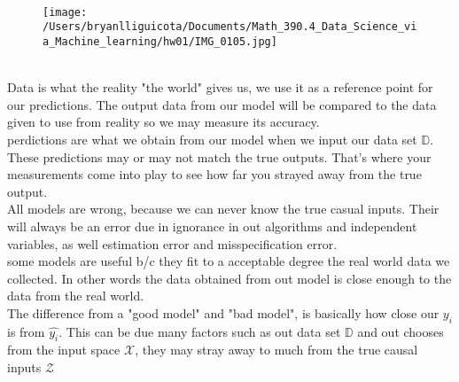 \documentclass[12pt]{article}
\begin{document}
\begin{enumerate}

\\
\begin{figure}[h!]
  \texttt{[image: /Users/bryanlliguicota/Documents/Math\_390.4\_Data\_Science\_via\_Machine\_learning/hw01/IMG\_0105.jpg]}
  \label{fig:boat1}
\end{figure}


\\Data is what the reality "the world" gives us, we use it as a reference point for our predictions. The output data from our model will be compared to the data given to use from reality so we may measure its accuracy.
\\perdictions are what we obtain from our model when we input our data set $\mathbb{D}$. These predictions may or may not match the true outputs. That's where your measurements come into play to see how far you strayed away from the true output.
\\All models are wrong, because we can never know the true casual inputs. Their will always be an error due in ignorance in out algorithms and  independent variables, as well estimation error and misspecification error.
\\some models are useful b/c they fit to a acceptable degree the real world data we collected. In other words the data obtained from out model is close enough to the data from the real world.
\\ The difference from a "good model" and "bad model", is basically how close our $y_{i}$ is from  $\hat{y_{i}}$. This can be due many factors such as out data set $\mathbb{D}$ and out chooses from the input space $\mathcal{X}$, they may stray away to much from the true causal inputs $\mathcal{Z}$
\end{enumerate}
\end{document}
